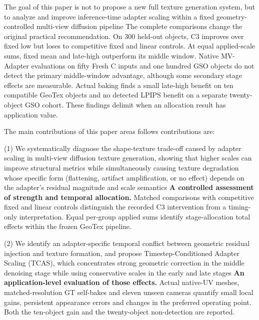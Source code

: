 \documentclass[times,twocolumn,final]{elsarticle}
\providecommand{\DIFadd}[1]{{\protect\color{blue} \sf #1}} %
\providecommand{\DIFdel}[1]{{\protect\color{red} \scriptsize #1}} %
\providecommand{\DIFaddbegin}{} %
\providecommand{\DIFaddend}{} %
\providecommand{\DIFdelbegin}{} %
\providecommand{\DIFdelend}{} %
\begin{document}
\DIFdelbegin \DIFdel{The goal of this paper is not to propose a new full texture generation system, but to analyze and improve inference-time adapter scaling within a fixed geometry-controlled multi-view diffusion pipeline}\DIFdelend \DIFaddbegin \DIFadd{The complete comparisons change the original practical recommendation. On 300 held-out objects, C3 improves over fixed low but loses to competitive fixed and linear controls. At equal applied-scale sums, fixed mean and late-high outperform its middle window. Native MV-Adapter evaluations on fifty Fresh C inputs and one hundred GSO objects do not detect the primary middle-window advantage, although some secondary stage effects are measurable. Actual baking finds a small late-high benefit on ten compatible GeoTex objects and no detected LPIPS benefit on a separate twenty-object GSO cohort. These findings delimit when an allocation result has application value}\DIFaddend .

The \DIFdelbegin \DIFdel{main contributions of this paper areas follows}\DIFdelend \DIFaddbegin \DIFadd{contributions are}\DIFaddend :

(1) \DIFdelbegin \DIFdel{We systematically diagnose the shape-texture trade-off caused by adapter scaling in multi-view diffusion texture generation, showing that higher scales can improve structural metrics while simultaneously causing texture degradation whose specific form (flattening, artifact amplification, or no effect) depends on the adapter's residual magnitude and scale semantics}\DIFdelend \DIFaddbegin \DIFadd{\textbf{A controlled assessment of strength and temporal allocation.} Matched comparisons with competitive fixed and linear controls distinguish the recorded C3 intervention from a timing-only interpretation. Equal per-group applied sums identify stage-allocation total effects within the frozen GeoTex pipeline}\DIFaddend .

(2) \DIFdelbegin \DIFdel{We identify an adapter-specific temporal conflict between geometric residual injection and texture formation, and propose Timestep-Conditioned Adapter Scaling (TCAS), which concentrates strong geometric correction in the middle denoising stage while using conservative scales in the early and late stages}\DIFdelend \DIFaddbegin \DIFadd{\textbf{An application-level evaluation of those effects.} Actual native-UV meshes, matched-resolution GT self-bakes and eleven unseen cameras quantify small local gains, persistent appearance errors and changes in the preferred operating point. Both the ten-object gain and the twenty-object non-detection are reported}\DIFaddend .
\end{document}
